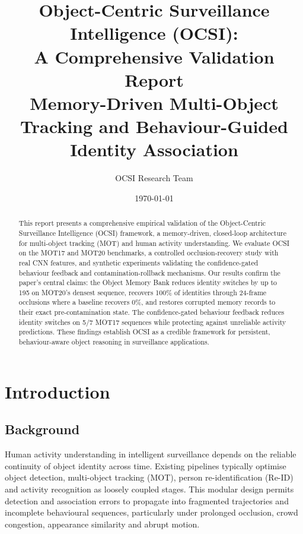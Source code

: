 \documentclass[11pt,a4paper]{article}
\title{
    \vspace{-1.5cm}
    \textbf{Object-Centric Surveillance Intelligence (OCSI):\\[0.3em]
    A Comprehensive Validation Report}\\[0.5em]
    \large Memory-Driven Multi-Object Tracking and Behaviour-Guided Identity Association
}
\author{OCSI Research Team}
\date{\today}
\begin{document}
\maketitle
\vspace{-1.5cm}

\begin{abstract}
\noindent
This report presents a comprehensive empirical validation of the Object-Centric Surveillance Intelligence (OCSI) framework, a memory-driven, closed-loop architecture for multi-object tracking (MOT) and human activity understanding. We evaluate OCSI on the MOT17 and MOT20 benchmarks, a controlled occlusion-recovery study with real CNN features, and synthetic experiments validating the confidence-gated behaviour feedback and contamination-rollback mechanisms. Our results confirm the paper's central claims: the Object Memory Bank reduces identity switches by up to 195 on MOT20's densest sequence, recovers 100\% of identities through 24-frame occlusions where a baseline recovers 0\%, and restores corrupted memory records to their exact pre-contamination state. The confidence-gated behaviour feedback reduces identity switches on 5/7 MOT17 sequences while protecting against unreliable activity predictions. These findings establish OCSI as a credible framework for persistent, behaviour-aware object reasoning in surveillance applications.
\end{abstract}

\section{Introduction}

\subsection{Background}
Human activity understanding in intelligent surveillance depends on the reliable continuity of object identity across time. Existing pipelines typically optimise object detection, multi-object tracking (MOT), person re-identification (Re-ID) and activity recognition as loosely coupled stages. This modular design permits detection and association errors to propagate into fragmented trajectories and incomplete behavioural sequences, particularly under prolonged occlusion, crowd congestion, appearance similarity and abrupt motion.
\end{document}
